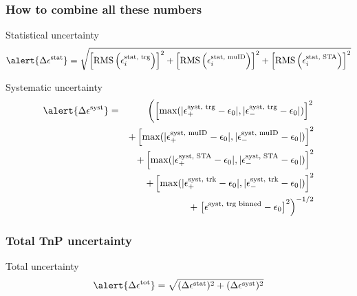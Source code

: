 \documentclass[9pt]{beamer}
\begin{document}
 \begin{frame}[plain]
  \frametitle{How to combine all these numbers}
  
  
  \begin{block}{Statistical uncertainty}
   \begin{equation*}
    \alert{\Delta\epsilon^\text{stat}}  =  \sqrt{ \left[\text{RMS} \left( \epsilon^\text{stat, trg}_i \right)\right]^2
     + \left[ \text{RMS} \left( \epsilon^\text{stat, muID}_i \right) \right]^2
     + \left[ \text{RMS} \left( \epsilon^\text{stat, STA}_i \right) \right]^2 }
   \end{equation*}

  \end{block}
  
  \begin{block}{Systematic uncertainty}
   \begin{eqnarray}
    \alert{\Delta\epsilon^\text{syst}}  & = &  \left(\left[\text{max} (|\epsilon^\text{syst, trg}_{+} - \epsilon_0|, |\epsilon^\text{syst, trg}_{-} - \epsilon_0|)\right]^2\right.\nonumber\\
    &&+ \left[\text{max} (|\epsilon^\text{syst, muID}_{+} - \epsilon_0|, |\epsilon^\text{syst, muID}_{-} - \epsilon_0|)\right]^2\nonumber\\
    &&+ \left[\text{max} (|\epsilon^\text{syst, STA}_{+} - \epsilon_0|, |\epsilon^\text{syst, STA}_{-} - \epsilon_0|)\right]^2\nonumber\\
    &&+ \left[\text{max} (|\epsilon^\text{syst, trk}_{+} - \epsilon_0|, |\epsilon^\text{syst, trk}_{-} - \epsilon_0|)\right]^2\nonumber\\
    &&+ \left.\left[\epsilon^\text{syst, trg binned} - \epsilon_0\right]^2\right)^{-1/2}\nonumber
   \end{eqnarray}

  \end{block}

 \end{frame}
 
 \begin{frame}[plain]
  \frametitle{Total TnP uncertainty}
  
  \begin{block}{Total uncertainty}
   \begin{equation*}
    \alert{\Delta\epsilon^\text{tot}}  =  \sqrt{ (\Delta\epsilon^\text{stat})^2 + (\Delta\epsilon^\text{syst})^2 }
   \end{equation*}

  \end{block}
  
 \end{frame}
\end{document}
